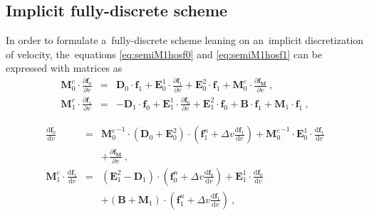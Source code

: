 \documentclass[review]{elsarticle}
\newcommand{\pdv}[2]{\frac{\partial{#1}}{\partial{#2}}}
\newcommand{\vect}[1]{\boldsymbol{#1}}
\newcommand{\matr}[1]{\mathbf{#1}}
\newcommand{\dI}{\text{d}}
\newcommand{\odv}[2]{\frac{\dI #1}{\dI #2}}
\newcommand{\ddv}[2]{\odv{#1}{#2}}
\newcommand{\vmag}{v}
\newcommand{\fM}{f_M}
\newcommand{\vfzero}{\vect{f}_0}
\newcommand{\fone}{\vect{f}_1}
\begin{document}
\subsection{Implicit fully-discrete scheme}\label{sec:impl_fullydiscrete_scheme}
In order to formulate a~fully-discrete scheme leaning on an~implicit 
discretization of velocity, the~equations \eqref{eq:semiM1hosf0} and 
\eqref{eq:semiM1hosf1} can be expressed with matrices as
\begin{eqnarray}
  \matr{M}^c_0 \cdot \pdv{\vfzero}{\vmag}  
  &=& 
  \matr{D}_0 \cdot \fone
  + \matr{E}_0^1 \cdot \pdv{\fone}{\vmag} + \matr{E}_0^2 \cdot \fone
  + \matr{M}^c_0 \cdot \pdv{\vect{\fM}}{\vmag}~,  
  \nonumber\\
  \matr{M}^c_1 \cdot \pdv{\fone}{\vmag}  
  &=& 
  - \matr{D}_1 \cdot \vfzero 
  + \matr{E}_1^1 \cdot \pdv{\vfzero}{\vmag}
  + \matr{E}_1^2 \cdot \vfzero
  + \matr{B} \cdot \fone
  + \matr{M}_1 \cdot \fone~,
  \nonumber
\end{eqnarray}

\begin{eqnarray}
  \ddv{\vfzero}{\vmag}  
  &=& 
  {\matr{M}^c_0}^{-1} \cdot \left(\matr{D}_0 + \matr{E}_0^2 \right) 
  \cdot \left(\fone^n + \Delta \vmag \ddv{\fone}{\vmag} \right)
  + {\matr{M}^c_0}^{-1} \cdot \matr{E}_0^1 \cdot \ddv{\fone}{\vmag} \nonumber\\
  && + \pdv{\vect{\fM}}{\vmag}~,  
  \nonumber\\
  \matr{M}^c_1 \cdot \ddv{\fone}{\vmag}  
  &=& 
  \left( \matr{E}_1^2 - \matr{D}_1 \right) 
  \cdot \left(\vfzero^n + \Delta\vmag \ddv{\vfzero}{\vmag} \right) 
  + \matr{E}_1^1 \cdot \ddv{\vfzero}{\vmag} \nonumber\\
  && + \left( \matr{B} + \matr{M}_1 \right)  
  \cdot \left(\fone^n + \Delta \vmag \ddv{\fone}{\vmag} \right)~,
  \nonumber
\end{eqnarray}

\end{document}
